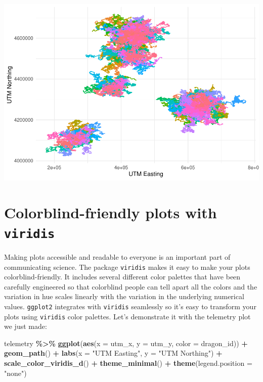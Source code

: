\documentclass[
]{book}
\newenvironment{Shaded}{\begin{snugshade}}{\end{snugshade}}
\newcommand{\AttributeTok}[1]{\textcolor[rgb]{0.13,0.29,0.53}{#1}}
\newcommand{\FunctionTok}[1]{\textcolor[rgb]{0.13,0.29,0.53}{\textbf{#1}}}
\newcommand{\NormalTok}[1]{#1}
\newcommand{\SpecialCharTok}[1]{\textcolor[rgb]{0.81,0.36,0.00}{\textbf{#1}}}
\newcommand{\StringTok}[1]{\textcolor[rgb]{0.31,0.60,0.02}{#1}}
\begin{document}
\includegraphics{reproducible-science_files/figure-latex/gg31-1.pdf}

\hypertarget{colorblind-friendly-plots-with-viridis}{%
\section{\texorpdfstring{Colorblind-friendly plots with \texttt{viridis}}{Colorblind-friendly plots with viridis}}\label{colorblind-friendly-plots-with-viridis}}

Making plots accessible and readable to everyone is an important part of
communicating science. The package \texttt{viridis} makes it easy to make your plots
colorblind-friendly. It includes several different color palettes that have been
carefully engineered so that colorblind people can tell apart all the colors
and the variation in hue scales linearly with the variation in the underlying
numerical values. \texttt{ggplot2} integrates with \texttt{viridis} seamlessly so it's easy
to transform your plots using \texttt{viridis} color palettes. Let's demonstrate it
with the telemetry plot we just made:

\begin{Shaded}
\begin{Highlighting}[]
\NormalTok{telemetry }\SpecialCharTok{\%\textgreater{}\%} 
  \FunctionTok{ggplot}\NormalTok{(}\FunctionTok{aes}\NormalTok{(}\AttributeTok{x =}\NormalTok{ utm\_x, }\AttributeTok{y =}\NormalTok{ utm\_y, }\AttributeTok{color =}\NormalTok{ dragon\_id)) }\SpecialCharTok{+}
  \FunctionTok{geom\_path}\NormalTok{() }\SpecialCharTok{+}
  \FunctionTok{labs}\NormalTok{(}\AttributeTok{x =} \StringTok{"UTM Easting"}\NormalTok{, }\AttributeTok{y =} \StringTok{"UTM Northing"}\NormalTok{) }\SpecialCharTok{+}
  \FunctionTok{scale\_color\_viridis\_d}\NormalTok{() }\SpecialCharTok{+}
  \FunctionTok{theme\_minimal}\NormalTok{() }\SpecialCharTok{+}
  \FunctionTok{theme}\NormalTok{(}\AttributeTok{legend.position =} \StringTok{"none"}\NormalTok{)}
\end{Highlighting}
\end{Shaded}
\end{document}
